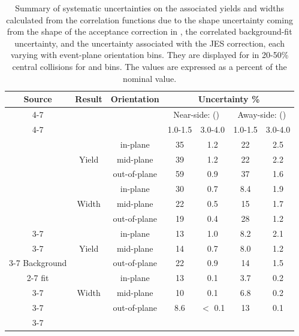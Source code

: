 \begin{table}[!htbp]
	\caption{Summary of systematic uncertainties on the associated yields and widths calculated from the correlation functions due to the shape uncertainty coming from the shape of the acceptance correction in \deta, the correlated background-fit uncertainty, and the uncertainty associated with the JES correction, each varying with event-plane orientation bins.  They are displayed for  in 20-50\% central \AuAu collisions for  and  bins.  The values are expressed as a percent of the nominal value. }
	\label{Tab:SystematicSummaryEPdep2040}
	\centering
	\begin{tabular}{c | c | c | c | c | c | c}\hline
		\multirow{3}{*}{Source} & \multirow{3}{*}{Result} & \multirow{3}{*}{Orientation} & \multicolumn{4}{c}{Uncertainty \%} \\ \cline{4-7}
		&   &      & \multicolumn{2}{c|}{Near-side: \Pt{assoc} (\GeVc)} & \multicolumn{2}{c}{Away-side: \Pt{assoc} (\GeVc)} \Bstrut \\ \cline{4-7}     
		&   &      & 1.0-1.5 & 3.0-4.0 & 1.0-1.5 & 3.0-4.0 \\ \hline           
		
		\multirow{6}{*}{} & \multirow{3}{*}{Yield} & in-plane & 35 & 1.2 & 22 & 2.5  \\ \cline{3-7}
		& & mid-plane & 39 & 1.2 & 22 & 2.2 \\ \cline{3-7}
		Acceptance & & out-of-plane & 59 & 0.9 & 37 & 1.6 \\ \cline{2-7}
		shape & \multirow{3}{*}{Width} & in-plane & 30 & 0.7 & 8.4 & 1.9 \\ \cline{3-7}
		& & mid-plane    & 22 & 0.5 & 15  & 1.7 \\ \cline{3-7}
		& & out-of-plane & 19 & 0.4 & 28  & 1.2 \\ \cline{3-7}
		\hline
		
		\multirow{6}{*}{} & \multirow{3}{*}{Yield} & in-plane & 13 & 1.0 & 8.2 & 2.1 \\ \cline{3-7}
		& & mid-plane & 14 & 0.7 & 8.0 & 1.2 \\ \cline{3-7}
		Background & & out-of-plane & 22 & 0.9 & 14 & 1.5  \\ \cline{2-7}
		fit & \multirow{3}{*}{Width} & in-plane & 13 & 0.1 & 3.7 & 0.2 \\ \cline{3-7}
		& & mid-plane    & 10  & 0.1 & 6.8 & 0.2 \\ \cline{3-7}
		& & out-of-plane & 8.6 & $<$ 0.1 & 13  & 0.1 \\ \cline{3-7}
		\hline
		

\end{tabular}
\end{table}

